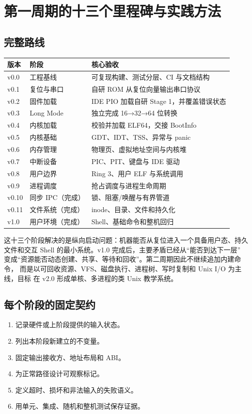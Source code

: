 \section{第一周期的十三个里程碑与实践方法}

\subsection{完整路线}

\begin{longtable}{p{}p{}p{}}
\toprule
版本 & 阶段 & 核心验收 \\
\midrule
v0.0 & 工程基线 & 可复现构建、测试分层、CI 与文档结构 \\
v0.1 & 复位与串口 & 自研 ROM 从复位向量输出串口协议 \\
v0.2 & 固件加载 & IDE PIO 加载自研 Stage 1，并覆盖错误状态 \\
v0.3 & Long Mode & 独立完成 16→32→64 位转换 \\
v0.4 & 内核加载 & 校验并加载 ELF64，交接 BootInfo \\
v0.5 & 内核基础 & GDT、IDT、TSS、异常与 panic \\
v0.6 & 内存管理 & 物理页、虚拟地址空间与内核堆 \\
v0.7 & 中断设备 & PIC、PIT、键盘与 IDE 驱动 \\
v0.8 & 用户边界 & Ring 3、用户 ELF 与系统调用 \\
v0.9 & 进程调度 & 抢占调度与进程生命周期 \\
v0.10 & 同步 IPC（完成） & 锁、阻塞/唤醒与有界管道 \\
v0.11 & 文件系统（完成） & inode、目录、文件和持久化 \\
v1.0 & 用户环境（完成） & Shell、基础命令和整机回归 \\
\bottomrule
\end{longtable}

这十三个阶段解决的是纵向启动问题：机器能否从复位进入一个具备用户态、持久
文件和交互 Shell 的最小系统。v1.0 完成后，主要矛盾已经从“能否到达下一层”
变成“资源能否动态创建、共享、等待和回收”。第二周期因此不继续追加内建命令，
而是以可回收资源、VFS、磁盘执行、进程树、写时复制和 Unix I/O 为主线，目标
在 v2.0 形成单核、多进程的类 Unix 教学系统。

\subsection{每个阶段的固定契约}

\begin{enumerate}[label=\arabic*.]
  \item 记录硬件或上阶段提供的输入状态。
  \item 列出本阶段新建立的不变量。
  \item 固定输出接收方、地址布局和 ABI。
  \item 为正常路径设计可观察标记。
  \item 定义超时、损坏和非法输入的失败语义。
  \item 用单元、集成、随机和整机测试保存证据。
\end{enumerate}

